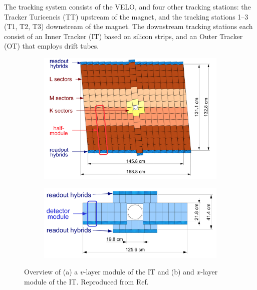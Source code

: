The tracking system consists of the VELO, and four other tracking stations: the Tracker Turicencis (TT) upstream of the magnet, and the tracking stations 1--3 (T1, T2, T3) downstream of the magnet. The downstream tracking stations each consist of an Inner Tracker (IT) based on silicon strips, and an Outer Tracker (OT) that employs drift tubes. 

\begin{figure}[tb]
    \centering
    \begin{subfigure}{0.55\columnwidth}
        \includegraphics[width=\columnwidth]{figures/detector/TT_station.png}
        \caption{\label{fig:TT_station}}
    \end{subfigure}
    \begin{subfigure}{0.42\columnwidth}
        \includegraphics[width=\columnwidth]{figures/detector/IT_station.png}
        \caption{\label{fig:IT_station}}
    \end{subfigure}
    \caption{Overview of (a) a $v$-layer module of the IT and (b) and $x$-layer module of the IT. Reproduced from Ref.~\cite{LHCb-detector}}
    \label{fig:TT_IT_stations}
\end{figure}

